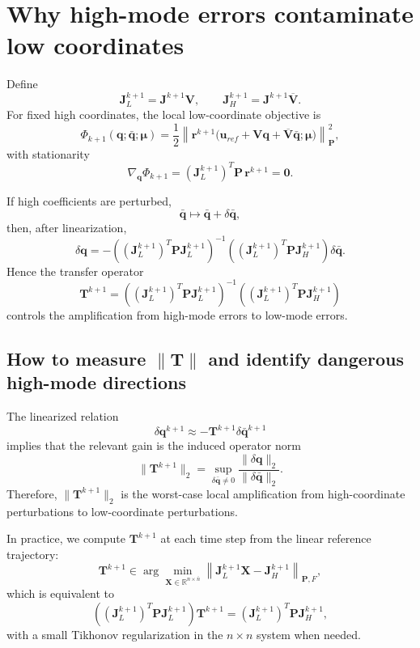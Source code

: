 \documentclass[11pt]{article}
\begin{document}
\section{Why high-mode errors contaminate low coordinates}
Define
\[
\mathbf J_L^{k+1}=\mathbf J^{k+1}\mathbf V,
\qquad
\mathbf J_H^{k+1}=\mathbf J^{k+1}\overline{\mathbf V}.
\]
For fixed high coordinates, the local low-coordinate objective is
\[
\Phi_{k+1}(\mathbf q;\bar{\mathbf q};\bm\mu)=
\frac12\left\|
\mathbf r^{k+1}\big(
\mathbf u_{ref}+\mathbf V\mathbf q+\overline{\mathbf V}\bar{\mathbf q};\bm\mu
\big)\right\|_{\mathbf P}^2,
\]
with stationarity
\[
\nabla_{\mathbf q}\Phi_{k+1}=(\mathbf J_L^{k+1})^T\mathbf P\,\mathbf r^{k+1}=\mathbf 0.
\]

If high coefficients are perturbed,
\[
\bar{\mathbf q}\mapsto \bar{\mathbf q}+\delta\bar{\mathbf q},
\]
then, after linearization,
\[
\delta\mathbf q
=-\left((\mathbf J_L^{k+1})^T\mathbf P\mathbf J_L^{k+1}\right)^{-1}
\left((\mathbf J_L^{k+1})^T\mathbf P\mathbf J_H^{k+1}\right)\delta\bar{\mathbf q}.
\]
Hence the transfer operator
\[
\mathbf T^{k+1}=
\left((\mathbf J_L^{k+1})^T\mathbf P\mathbf J_L^{k+1}\right)^{-1}
\left((\mathbf J_L^{k+1})^T\mathbf P\mathbf J_H^{k+1}\right)
\]
controls the amplification from high-mode errors to low-mode errors.

\subsection*{How to measure \(\|\mathbf T\|\) and identify dangerous high-mode directions}
The linearized relation
\[
\delta\mathbf q^{k+1}\approx-\mathbf T^{k+1}\delta\bar{\mathbf q}^{k+1}
\]
implies that the relevant gain is the induced operator norm
\[
\|\mathbf T^{k+1}\|_{2}
=
\sup_{\delta\bar{\mathbf q}\neq 0}
\frac{\|\delta\mathbf q\|_2}{\|\delta\bar{\mathbf q}\|_2}.
\]
Therefore, \(\|\mathbf T^{k+1}\|_2\) is the worst-case local amplification from high-coordinate perturbations to low-coordinate perturbations.

In practice, we compute \(\mathbf T^{k+1}\) at each time step from the linear reference trajectory:
\[
\mathbf T^{k+1}
\in
\arg\min_{\mathbf X\in\mathbb R^{n\times\bar n}}
\left\|
\mathbf J_L^{k+1}\mathbf X-\mathbf J_H^{k+1}
\right\|_{\mathbf P,F},
\]
which is equivalent to
\[
\left((\mathbf J_L^{k+1})^T\mathbf P\mathbf J_L^{k+1}\right)\mathbf T^{k+1}
=
(\mathbf J_L^{k+1})^T\mathbf P\mathbf J_H^{k+1},
\]
with a small Tikhonov regularization in the \(n\times n\) system when needed.
\end{document}
